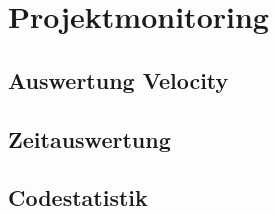 
\section{Projektmonitoring}
\label{Projektmonitoring}


\subsection{Auswertung Velocity}
\label{Projektmonitoring:Auswertung Velocity}


\subsection{Zeitauswertung}
\label{Projektmonitoring:Zeitauswertung}


\subsection{Codestatistik}
\label{Projektmonitoring:Codestatistik}

